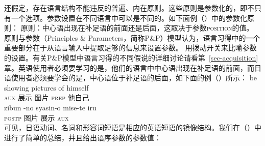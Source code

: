  \citet{Chomsky81a}还假定，存在语言结构不能违反的普遍、内在原则。这些原则是参数化的，即不只有一个选项。参数设置在不同语言中可以是不同的。如下面例（）中的参数化原则：
\ea
原则：中心语出现在补足语的前面还是后面，这取决于参数\textsc{position}的值。
\z
原则与参数（Principles \& Parameters，简称P\&P）模型认为，语言习得中的一个重要部分在于从语言输入中提取足够的信息来设置参数。 \citet[]{Chomsky2000a-u}用拨动开关来比喻参数的设置。有关P\&P模型中语言习得的不同假说的详细讨论请看第~\ref{sec-acquisition}章。英语使用者必须要学习的是，他们的语言中中心语出现在补足语的前面，而日语使用者必须要学会的是，中心语位于补足语的后面，如下面的例（）所示：
\eal
\label{Bsp-Kopfstellungsparameter}
\ex 
\gll be showing pictures of himself\\
     \textsc{aux} 展示 图片 \textsc{prep} 他自己\\
\ex
\gll zibun -no syasin-o mise-te iru\\
         \textsc{postp} 图片 展示 \textsc{aux}\\
\zl
可见，日语动词、名词和形容词短语是相应的英语短语的镜像结构。我们在（）中进行了简单的总结，并且给出语序参数的参数值：
